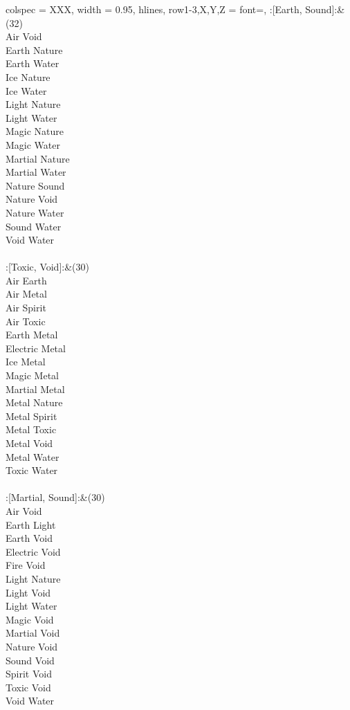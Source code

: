 \begin{longtblr}[
	caption = {2v2 Defending Resisted},
	label = {2v2-Defending-Resisted},
]{
	colspec = {XXX}, width = 0.95\linewidth,
	hlines,
	row{1-3,X,Y,Z} = {font=\bfseries},
}
	:[Earth, Sound]:&{(32)\\
	Air Void \\
	Earth Nature \\
	Earth Water \\
	Ice Nature \\
	Ice Water \\
	Light Nature \\
	Light Water \\
	Magic Nature \\
	Magic Water \\
	Martial Nature \\
	Martial Water \\
	Nature Sound \\
	Nature Void \\
	Nature Water \\
	Sound Water \\
	Void Water \\
	}\\

	:[Toxic, Void]:&{(30)\\
	Air Earth \\
	Air Metal \\
	Air Spirit \\
	Air Toxic \\
	Earth Metal \\
	Electric Metal \\
	Ice Metal \\
	Magic Metal \\
	Martial Metal \\
	Metal Nature \\
	Metal Spirit \\
	Metal Toxic \\
	Metal Void \\
	Metal Water \\
	Toxic Water \\
	}\\

	:[Martial, Sound]:&{(30)\\
	Air Void \\
	Earth Light \\
	Earth Void \\
	Electric Void \\
	Fire Void \\
	Light Nature \\
	Light Void \\
	Light Water \\
	Magic Void \\
	Martial Void \\
	Nature Void \\
	Sound Void \\
	Spirit Void \\
	Toxic Void \\
	Void Water \\
	}\\


\end{longtblr}
